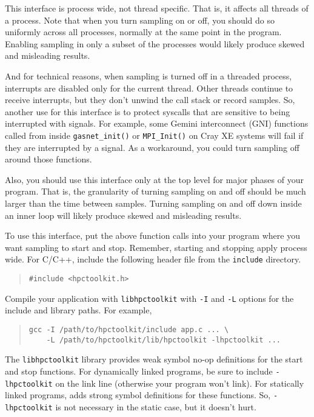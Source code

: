 This interface is process wide, not thread specific.  That is, it
affects all threads of a process.  Note that when you turn sampling on
or off, you should do so uniformly across all processes, normally at
the same point in the program.  Enabling sampling in only a subset of
the processes would likely produce skewed and misleading results.

And for technical reasons, when sampling is turned off in a threaded
process, interrupts are disabled only for the current thread.  Other
threads continue to receive interrupts, but they don't unwind the call
stack or record samples.  So, another use for this interface is to
protect syscalls that are sensitive to being interrupted with signals.
For example, some Gemini interconnect (GNI) functions called from
inside \verb|gasnet_init()| or \verb|MPI_Init()| on Cray XE systems
will fail if they are interrupted by a signal.  As a workaround, you
could turn sampling off around those functions.

Also, you should use this interface only at the top level for major
phases of your program.  That is, the granularity of turning sampling
on and off should be much larger than the time between samples.
Turning sampling on and off down inside an inner loop will likely
produce skewed and misleading results.

To use this interface, put the above function calls into your program
where you want sampling to start and stop.  Remember, starting and
stopping apply process wide.  For C/C++, include the following header
file from the \HPCToolkit{} {\tt include} directory.

\begin{quote}
\begin{verbatim}
#include <hpctoolkit.h>
\end{verbatim}
\end{quote}

Compile your application with {\tt libhpctoolkit} with {\tt -I} and
{\tt -L} options for the include and library paths.  For example,

\begin{quote}
\begin{verbatim}
gcc -I /path/to/hpctoolkit/include app.c ... \
    -L /path/to/hpctoolkit/lib/hpctoolkit -lhpctoolkit ...
\end{verbatim}
\end{quote}

The {\tt libhpctoolkit} library provides weak symbol no-op definitions
for the start and stop functions.  For dynamically linked programs, be
sure to include {\tt -lhpctoolkit} on the link line (otherwise your
program won't link).  For statically linked programs, \hpclink{} adds
strong symbol definitions for these functions.  So, {\tt -lhpctoolkit}
is not necessary in the static case, but it doesn't hurt.

